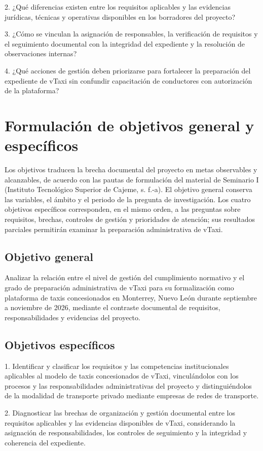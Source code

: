 {2. ¿Qué diferencias existen entre los requisitos aplicables y las evidencias jurídicas, técnicas y operativas disponibles en los borradores del proyecto?


3. ¿Cómo se vinculan la asignación de responsables, la verificación de requisitos y el seguimiento documental con la integridad del expediente y la resolución de observaciones internas?


4. ¿Qué acciones de gestión deben priorizarse para fortalecer la preparación del expediente de vTaxi sin confundir capacitación de conductores con autorización de la plataforma?


\section{Formulación de objetivos general y específicos}
Los objetivos traducen la brecha documental del proyecto en metas observables y alcanzables, de acuerdo con las pautas de formulación del material de Seminario I (Instituto Tecnológico Superior de Cajeme, s. f.-a). El objetivo general conserva las variables, el ámbito y el periodo de la pregunta de investigación. Los cuatro objetivos específicos corresponden, en el mismo orden, a las preguntas sobre requisitos, brechas, controles de gestión y prioridades de atención; sus resultados parciales permitirán examinar la preparación administrativa de vTaxi.


\subsection{Objetivo general}
Analizar la relación entre el nivel de gestión del cumplimiento normativo y el grado de preparación administrativa de vTaxi para su formalización como plataforma de taxis concesionados en Monterrey, Nuevo León durante septiembre a noviembre de 2026, mediante el contraste documental de requisitos, responsabilidades y evidencias del proyecto.


\subsection{Objetivos específicos}
1. Identificar y clasificar los requisitos y las competencias institucionales aplicables al modelo de taxis concesionados de vTaxi, vinculándolos con los procesos y las responsabilidades administrativas del proyecto y distinguiéndolos de la modalidad de transporte privado mediante empresas de redes de transporte.


2. Diagnosticar las brechas de organización y gestión documental entre los requisitos aplicables y las evidencias disponibles de vTaxi, considerando la asignación de responsabilidades, los controles de seguimiento y la integridad y coherencia del expediente.


}
